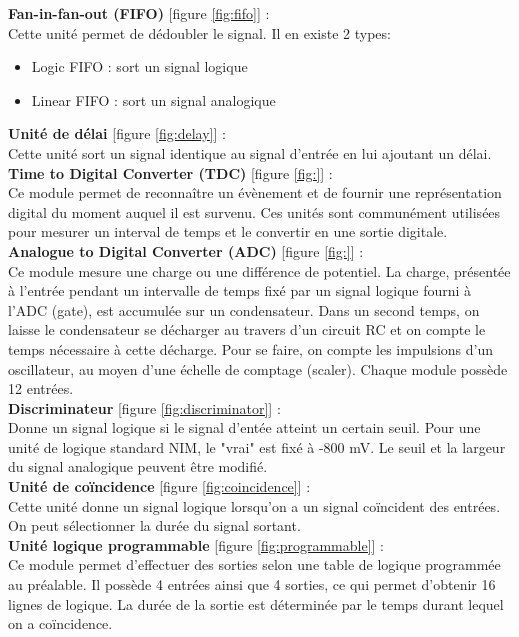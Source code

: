 \textbf{Fan-in-fan-out (FIFO)} [figure  \ref{fig:fifo}] :\\
Cette unité permet de dédoubler le signal. Il en existe 2 types:
\begin{itemize}
\item Logic FIFO : sort un signal logique
\item Linear FIFO : sort un signal analogique\\
\end{itemize}

\textbf{Unité de délai} [figure \ref{fig:delay}] :\\
Cette unité sort un signal identique au signal d'entrée en lui ajoutant un délai.\\

\textbf{Time to Digital Converter (TDC)} [figure \ref{fig:}] :\\
Ce module permet de reconnaître un évènement et de fournir une représentation digital du moment auquel il est survenu. Ces unités sont communément utilisées pour mesurer un interval de temps et le convertir en une sortie digitale.\\

\textbf{Analogue to Digital Converter (ADC)} [figure \ref{fig:}] :\\
Ce module mesure une charge ou une différence de potentiel. 
La charge, présentée à l’entrée pendant un intervalle de temps fixé par un signal logique fourni à l’ADC (gate), est accumulée sur un condensateur. Dans un second temps, on laisse le condensateur se décharger au travers d’un circuit RC et on compte le temps nécessaire à cette décharge. Pour se faire, on compte les impulsions d’un oscillateur, au moyen d’une échelle de comptage (scaler). Chaque module possède 12 entrées.\\

\textbf{Discriminateur} [figure \ref{fig:discriminator}] :\\
Donne un signal logique si le signal d'entée atteint un certain seuil. Pour une unité de logique standard NIM, le "vrai" est fixé à -800 mV. Le seuil et la largeur du signal analogique peuvent être modifié.\\

\textbf{Unité de coïncidence} [figure \ref{fig:coincidence}] :\\
Cette unité donne un signal logique lorsqu'on a un signal coïncident des entrées. On peut sélectionner la durée du signal sortant.\\

\textbf{Unité logique programmable} [figure  \ref{fig:programmable}]  :\\
Ce module permet d'effectuer des sorties selon une table de logique programmée au préalable. Il possède 4 entrées ainsi que 4 sorties, ce qui permet d'obtenir 16 lignes de logique. La durée de la sortie est déterminée par le temps durant lequel on a coïncidence. \\
